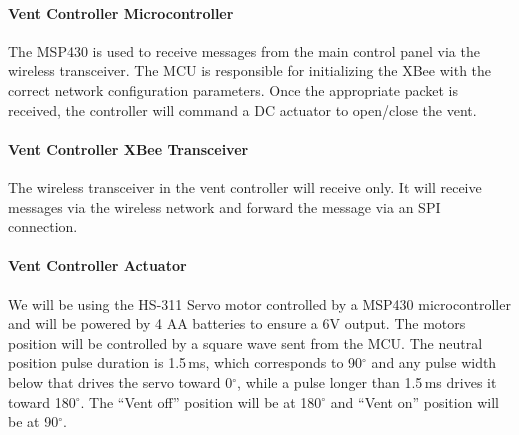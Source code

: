 \paragraph{Vent Controller Microcontroller}
The MSP430 is used to receive messages from the main control panel via the wireless transceiver.  The MCU is responsible for initializing the XBee with the correct network configuration parameters.  Once the appropriate packet is received, the controller will command a DC actuator to open/close the vent.
\paragraph{Vent Controller XBee Transceiver}
The wireless transceiver in the vent controller will receive only. It will receive messages via the wireless network and forward the message via an SPI connection.
\paragraph{Vent Controller Actuator}
We will be using the HS-311 Servo motor controlled by a MSP430 microcontroller and will be powered by 4 AA batteries to ensure a 6V output. The motors position will be controlled by a square wave sent from the MCU. The neutral position pulse duration is 1.5\,ms, which corresponds to 90$^{\circ}$ and any pulse width below that drives the servo toward 0$^{\circ}$, while a pulse longer than 1.5\,ms drives it toward 180$^{\circ}$. The ``Vent off'' position will be at 180$^{\circ}$ and ``Vent on'' position will be at 90$^{\circ}$.
